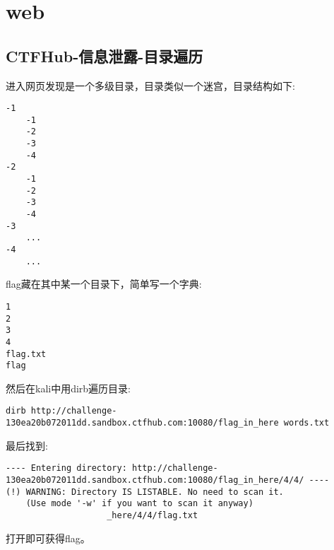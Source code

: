 \chapter{web}
\section{CTFHub-信息泄露-目录遍历}
进入网页发现是一个多级目录，目录类似一个迷宫，目录结构如下:
\begin{lstlisting}
-1
	-1
	-2
	-3
	-4
-2
	-1
	-2
	-3
	-4
-3
	...
-4
	...
\end{lstlisting}

flag藏在其中某一个目录下，简单写一个字典:
\begin{lstlisting}
1
2
3
4
flag.txt
flag
\end{lstlisting}

然后在kali中用dirb遍历目录:
\begin{lstlisting}
dirb http://challenge-130ea20b072011dd.sandbox.ctfhub.com:10080/flag_in_here words.txt
\end{lstlisting}

最后找到:

\begin{lstlisting}
---- Entering directory: http://challenge-130ea20b072011dd.sandbox.ctfhub.com:10080/flag_in_here/4/4/ ----
(!) WARNING: Directory IS LISTABLE. No need to scan it.
    (Use mode '-w' if you want to scan it anyway)
                    _here/4/4/flag.txt
\end{lstlisting}

打开即可获得flag。